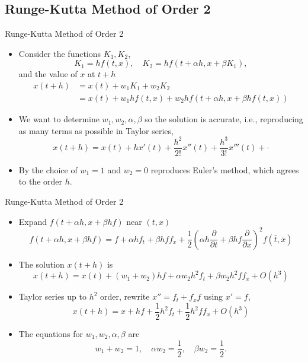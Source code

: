 \documentclass{beamer}
\begin{document}
\subsection[Runge-Kutta Method of Order 2]{Runge-Kutta Method of Order 2}
\begin{frame}{Runge-Kutta Method of Order 2}
\begin{itemize}
\item Consider the functions $K_1, K_2$, 
\[
K_1 = h f(t,x),\quad K_2 =h f(t+\alpha h, x+\beta K_1),
\]
and the value of $x$ at $t+h$ 
\begin{align*}
x(t+h)&=x(t)+w_1K_1+w_2 K_2\\
&=x(t)+w_1hf(t,x)+w_2h f(t+\alpha h, x+\beta h f(t,x))
\end{align*}
\item We want to determine $w_1, w_2, \alpha,\beta$ so the solution is \alert{accurate}, i.e., reproducing as many terms as possible in Taylor series,
\[
x(t+h)=x(t)+h x'(t)+\frac{h^2}{2!}x''(t)+\frac{h^3}{3!}x'''(t) +\cdot
\]
\item By the choice of $w_1=1$ and $w_2=0$ reproduces Euler's method, which agrees to the order $h$.
\end{itemize}
\end{frame}
\begin{frame}{Runge-Kutta Method of Order 2}
\begin{itemize}
\item Expand $f(t+\alpha h, x+\beta h f)$ near $(t,x)$
\[
f(t+\alpha h, x +\beta h f) = f+\alpha h f_t +\beta h f f_x + \frac{1}{2}\left(\alpha h \frac{\partial }{\partial t} +\beta h f \frac{\partial }{\partial x} \right) ^2 f(\bar{t},\bar{x})
\]
\item The solution $x(t+h)$ is 
\[
x(t+h)=x(t)+(w_1+w_2) hf +\alpha w_2 h^2 f_t + \beta w_2 h^2 f f_x +O(h^3)
\]
\item Taylor series up to $h^2$ order, rewrite $x''=f_t+f_x f$ using $x'=f$, 
\[
x(t+h)=x +h f +\frac{1}{2}h^2 f_t +\frac{1}{2} h^2 f f_x +O(h^3)
\]
\item The equations for $w_1, w_2, \alpha, \beta$ are
\[
w_1+w_2=1, \quad \alpha w_2 = \frac{1}{2},  \quad \beta w_2 =\frac{1}{2}. 
\]
\end{itemize}
\end{frame}
\end{document}
